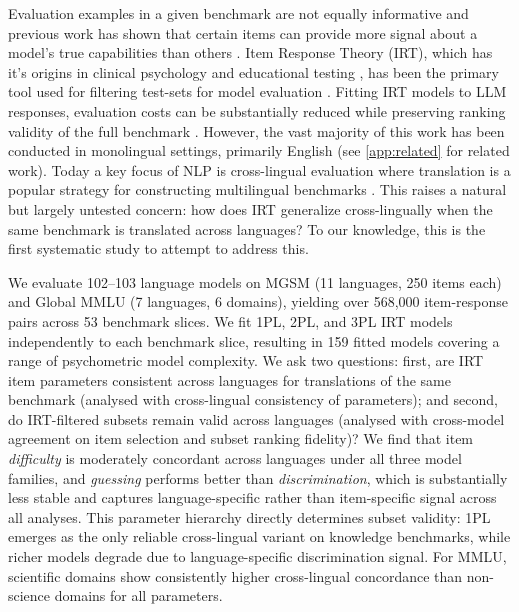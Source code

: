 \documentclass[11pt]{article}
\begin{document}
Evaluation examples in a given benchmark are not equally informative and previous work has shown that certain items can provide more signal about a model’s true capabilities than others \cite{rodriguez2021evaluation}. Item Response Theory (IRT), which has it's origins in clinical psychology \cite{harvey1999item} and educational testing \cite{yen2006item, lord2012applications}, has been the primary tool used for filtering test-sets for model evaluation \cite{lalor2016building, natesan2016bayesian, lalor2019learning, rodriguez2022clustering}. Fitting IRT models to LLM responses, evaluation costs can be substantially reduced while preserving ranking validity of the full benchmark \cite{hofmann2025fluid, zhou2026lost}. However, the vast majority of this work has been conducted in monolingual settings, primarily English (see \autoref{app:related} for related work). Today a key focus of NLP is cross-lingual evaluation \cite{hu2020xtreme, doddapaneni2025cross, chollampatt2025cross} where translation is a popular strategy for constructing multilingual benchmarks \cite{shi2023language, singh2025global}. This raises a natural but largely untested concern: how does IRT generalize cross-lingually when the same benchmark is translated across languages? To our knowledge, this is the first systematic study to attempt to address this.

We evaluate 102--103 language models on MGSM \cite{shi2023language} (11 languages, 250 items each) and Global MMLU \cite{singh2025global} (7 languages, 6 domains), yielding over 568,000 item-response pairs across 53 benchmark slices. We fit 1PL, 2PL, and 3PL IRT models independently to each benchmark slice, resulting in 159 fitted models covering a range of psychometric model complexity. We ask two questions: first, are IRT item parameters consistent across languages for translations of the same benchmark (analysed with cross-lingual consistency of parameters); and second, do IRT-filtered subsets remain valid across languages (analysed with cross-model agreement on item selection and subset ranking fidelity)? We find that item \emph{difficulty} is moderately concordant across languages under all three model families, and \emph{guessing} performs better than \emph{discrimination}, which is substantially less stable and captures language-specific rather than item-specific signal across all analyses. This parameter hierarchy directly determines subset validity: 1PL emerges as the only reliable cross-lingual variant on knowledge benchmarks, while richer models degrade due to language-specific discrimination signal. For MMLU, scientific domains show consistently higher cross-lingual concordance than non-science domains for all parameters.
\end{document}
